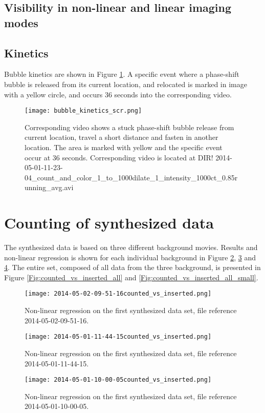 \subsection{Visibility in non-linear and linear imaging modes} 

\subsection{Kinetics}
Bubble kinetics are shown in Figure \ref{Fig:bubble_kinetic}. A specific event where a phase-shift bubble is released from its current location, and relocated is marked in image with a yellow circle, and occurs 36 seconds into the corresponding video.

\begin{figure}[h]
  \centering
  \label{Fig:bubble_kinetic}
  \texttt{[image: bubble\_kinetics\_scr.png]}
  \caption{Corresponding video shows a stuck phase-shift bubble release from current location, travel a short distance and fasten in another location. The area is marked with yellow and the specific event occur at 36 seconds. Corresponding video is located at DIR! 2014-05-01-11-23-04_count_and_color_1_to_1000dilate_1_intensity_1000ct_0.85running_avg.avi}
\end{figure}
\clearpage
\section{Counting of synthesized data}
The synthesized data is based on three different background movies. Results and non-linear regression is shown for each individual background in Figure \ref{Fig:counted_vs_inserted1}, \ref{Fig:counted_vs_inserted2} and \ref{Fig:counted_vs_inserted3}. The entire set, composed of all data from the three background, is presented in Figure \ref{Fig:counted_vs_inserted_all} and \ref{Fig:counted_vs_inserted_all_small}.
\begin{figure}[h]
  \centering
  \label{Fig:counted_vs_inserted1}
  \texttt{[image: 2014-05-02-09-51-16counted\_vs\_inserted.png]}
  \caption{Non-linear regression on the first synthesized data set, file reference 2014-05-02-09-51-16.}
\end{figure}
\begin{figure}[h]
  \centering
  \label{Fig:counted_vs_inserted2}
  \texttt{[image: 2014-05-01-11-44-15counted\_vs\_inserted.png]}
  \caption{Non-linear regression on the first synthesized data set, file reference 2014-05-01-11-44-15.}
\end{figure}
\begin{figure}[h]
  \centering
  \label{Fig:counted_vs_inserted3}
  \texttt{[image: 2014-05-01-10-00-05counted\_vs\_inserted.png]}
  \caption{Non-linear regression on the first synthesized data set, file reference 2014-05-01-10-00-05.}
\end{figure}

